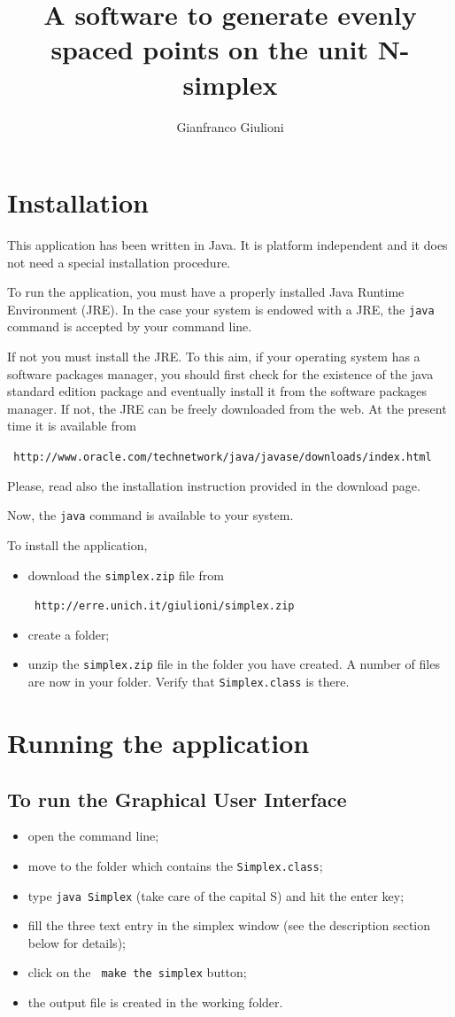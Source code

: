 \documentclass[12pt,a4paper]{article}
\title{A software to generate evenly spaced points on the unit N-simplex}
\author{Gianfranco Giulioni}
\begin{document}
\maketitle
\section*{Installation}
This application has been written in Java. It is platform independent and it does not need a special installation procedure. 

To run the application, you must have a properly installed Java Runtime Environment (JRE). In the case your system is endowed with a JRE, the \verb+java+ command is accepted by your command line. 

If not you must install the JRE. To this aim, if your operating system has a software packages manager, you should first check for the existence of the java standard edition package and eventually install it from the software packages manager. If not, the JRE can be freely downloaded from the web. At the present time it is available from 

\verb+ http://www.oracle.com/technetwork/java/javase/downloads/index.html +

Please, read also the installation instruction provided in the download page.

Now, the \verb+java+ command is available to your system.

To install the application,
\begin{itemize}
\item download the \verb+simplex.zip+ file from

\verb+ http://erre.unich.it/giulioni/simplex.zip+


\item create a folder; 
\item unzip the \verb+simplex.zip+ file in the folder you have created. A number of files are now in your folder. Verify that \verb+Simplex.class+ is there.
\end{itemize}

\section*{Running the application}
\subsection*{To run the Graphical User Interface}
\begin{itemize}
\item open the command line;
\item move to the folder which contains the \verb+Simplex.class+; 
\item type \verb+java Simplex+ (take care of the capital S) and hit the enter key;
\item fill the three text entry in the simplex window (see the description section below for details);
\item click on the \verb+ make the simplex+ button;
\item the output file is created in the working folder.
\end{itemize}
\end{document}
